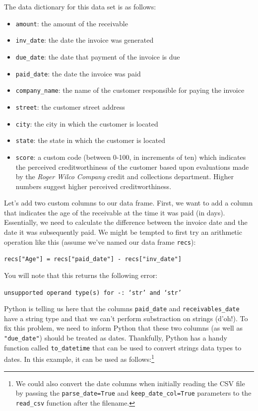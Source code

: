 \documentclass{book}
\begin{document}
The data dictionary for this data set is as follows:
\begin{itemize}
	\item \texttt{amount}: the amount of the receivable
	\item \texttt{inv\_date}: the date the invoice was generated
	\item \texttt{due\_date}: the date that payment of the invoice is due
	\item \texttt{paid\_date}: the date the invoice was paid
	\item \texttt{company\_name}: the name of the customer responsible for paying the invoice
	\item \texttt{street}: the customer street address
	\item \texttt{city}: the city in which the customer is located
	\item \texttt{state}: the state in which the customer is located
	\item \texttt{score}: a custom code (between 0-100, in increments of ten) which indicates the perceived creditworthiness of the customer based upon evaluations made by the \textit{Roger Wilco Company} credit and collections department. Higher numbers suggest higher perceived creditworthiness.
\end{itemize}

Let's add two custom columns to our data frame. First, we want to add a column that indicates the age of the receivable at the time it was paid (in days). Essentially, we need to calculate the difference between the invoice date and the date it was subsequently paid. We might be tempted to first try an arithmetic operation like this (assume we've named our data frame \texttt{recs}):

\texttt{recs["Age"] = recs["paid\_date"] - recs["inv\_date"]}

You will note that this returns the following error:

\texttt{unsupported operand type(s) for -: `str' and `str'}

Python is telling us here that the columns \texttt{paid\_date} and \texttt{receivables\_date} have a string type and that we can't perform substraction on strings (d'oh!). To fix this problem, we need to inform Python that these two columns (as well as \texttt{"due\_date"}) should be treated as dates. Thankfully, Python has a handy function called \texttt{to\_datetime} that can be used to convert strings data types to dates. In this example, it can be used as follows:\footnote{We could also convert the date columns when initially reading the CSV file by passing the \texttt{parse\_date=True} and \texttt{keep\_date\_col=True} parameters to the \texttt{read\_csv} function after the filename.}
\end{document}

